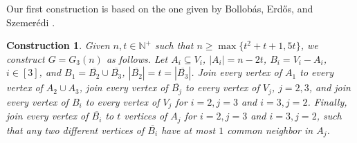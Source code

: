 \documentclass[11pt]{article}
\newtheorem{construction}[theorem]{Construction}
\numberwithin{equation}{section}
\begin{document}
Our first construction is based on the one given by Bollob\'{a}s, Erd\H{o}s, and Szemer\'{e}di \cite{bollobas1975complete}.
\begin{construction}\label{construction 1}
	Given $n, t \in \mathbb{N}^+$ such that $n\geq \max\{t^2 + t+1, 5t\}$, we construct $G=G_3(n)$ as follows. Let $A_i\subseteq V_i$, $|A_i|=n-2t$, $B_i=V_i-A_i$, $i\in [3]$, and $B_1=\overline{B_2}\cup \overline{B_3}$, $|\overline{B_2}|=t=|\overline{B_3}|$. Join every vertex of $A_1$ to every vertex of $A_2 \cup A_3$, join every vertex of $\overline{B_j}$ to every vertex of $V_j$, $j = 2,3$, and join every vertex of $B_i$ to every vertex of $V_j$ for $i = 2, j = 3$ and $i = 3, j = 2$. Finally, join every vertex of $\overline{B_i}$ to $t$ vertices of $A_j$ for $i = 2, j = 3$ and $i = 3, j = 2$, such that any two different vertices of $\overline{B_i}$ have at most $1$ common neighbor in $A_j$.
\end{construction}
\end{document}
